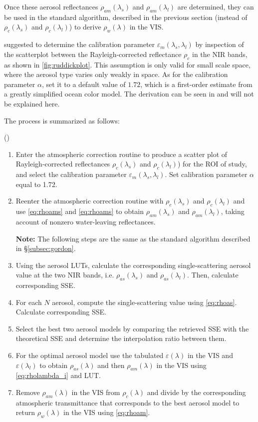 Once these aerosol reflectances $\rho_{am}(\lambda_s)$ and $\rho_{am}(\lambda_l)$ are determined, they can be used in the standard algorithm, described in the previous section (instead of $\rho_c(\lambda_s)$ and $\rho_c(\lambda_l)$) to derive $\rho_w(\lambda)$ in the VIS.

\cite{Ruddick:2000bs} suggested to determine the calibration parameter $\varepsilon_m(\lambda_s,\lambda_l)$ by inspection of the scatterplot between the Rayleigh-corrected reflectance $\rho_c$ in the NIR bands, as shown in \autoref{fig:ruddickplot}. This assumption is only valid for small scale space, where the aerosol type varies only weakly in space. As for the calibration parameter $\alpha$, \cite{Ruddick:2000bs} set it to a default value of $1.72$, which is a first-order estimate from a greatly simplified ocean color model. The derivation can be seen in \cite{Ruddick:2000bs} and will not be explained here.

The process is summarized as follows:

(\cite{Ruddick:2000bs})
\begin{enumerate}[itemsep=2pt,parsep=2pt]
  \item Enter the atmospheric correction routine to produce a scatter plot of Rayleigh-corrected reflectances $\rho_c(\lambda_s)$ and $\rho_c(\lambda_l)$) for the ROI of study, and select the calibration parameter $\varepsilon_m(\lambda_s,\lambda_l)$. Set calibration parameter $\alpha$ equal to 1.72.

  \item Reenter the atmospheric correction routine with $\rho_c(\lambda_s)$ and $\rho_c(\lambda_l)$ and use \autoref{eq:rhoams} and \autoref{eq:rhoams} to obtain $\rho_{am}(\lambda_s)$ and $\rho_{am}(\lambda_l)$, taking account of nonzero water-leaving reflectances.

  {\bf Note:} The following steps are the same as the standard algorithm described in \S\ref{subsec:gordon}.

  \item Using the aerosol LUTs, calculate the corresponding single-scattering aerosol value at the two NIR bands, i.e. $\rho_{as}(\lambda_s)$ and $\rho_{as}(\lambda_l)$. Then, calculate corresponding SSE.

  \item For each $N$ aerosol, compute the single-scattering value using \autoref{eq:rhoas}. Calculate corresponding SSE.
  \item Select the best two aerosol models by comparing the retrieved SSE with the theoretical SSE and determine the interpolation ratio between them.
  \item For the optimal aerosol model use the tabulated $\varepsilon(\lambda)$ in the VIS and $\varepsilon(\lambda_l)$ to obtain $\rho_{as}(\lambda)$ and then $\rho_{am}(\lambda)$ in the VIS using \autoref{eq:rholambda_i} and LUT.
  \item Remove $\rho_{am}(\lambda)$ in the VIS from $\rho_c(\lambda)$ and divide by the corresponding atmospheric transmittance that corresponds to the best aerosol model to return $\rho_w(\lambda)$ in the VIS using \autoref{eq:rhoam}.
\end{enumerate}

